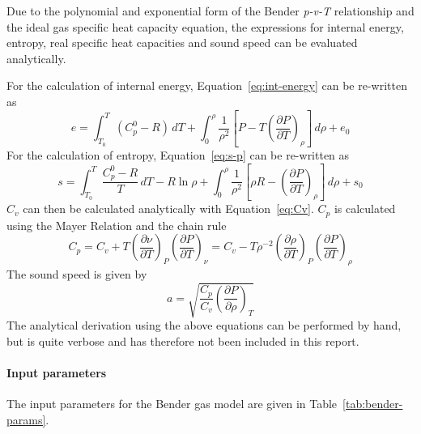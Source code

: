 Due to the polynomial and exponential form of the Bender \textit{p-v-T} relationship
and the ideal gas specific heat capacity equation,
the expressions for internal energy, entropy, real specific heat capacities and
sound speed can be evaluated analytically.

For the calculation of internal energy, Equation~\ref{eq:int-energy} can be
re-written as \cite{reynolds1979thermodynamic}
\begin{dmath}
e = \int_{T_0}^T \left(C_p^0 - R\right)\, dT
    + \int_0^{\rho}\frac{1}{\rho^2}\left[ P - T\left( \frac{\partial P}{\partial T} \right)_{\rho} \right]\, d\rho
    + e_0
\end{dmath}
For the calculation of entropy, Equation~\ref{eq:s-p} can be
re-written as \cite{reynolds1979thermodynamic}
\begin{dmath}
s = \int_{T_0}^T \frac{C_p^0 - R}{T}\, dT
    - R \ln{\rho}
    + \int_0^{\rho}\frac{1}{\rho^2}\left[ \rho R - \left( \frac{\partial P}{\partial T} \right)_{\rho} \right]\, d\rho
    + s_0
\end{dmath}
\(C_v\) can then be calculated analytically with Equation~\ref{eq:Cv}. \(C_p\) is
calculated using the Mayer Relation and the chain rule
\begin{dmath}
C_p = C_v + T\left(\frac{\partial\nu}{\partial T}\right)_P\left(\frac{\partial P}{\partial T}\right)_{\nu}
= C_v - T \rho^{-2} \left(\frac{\partial\rho}{\partial T}\right)_P\left(\frac{\partial P}{\partial T}\right)_{\rho}
\end{dmath}
The sound speed is given by
\begin{dmath}
a = \sqrt{\frac{C_p}{C_v} \left(\frac{\partial P}{\partial \rho}\right)_T}
\end{dmath}
The analytical derivation using the above equations can be performed by hand, but
is quite verbose and has therefore not been included in this report.

\paragraph{Input parameters}
The input parameters for the Bender gas model are given in Table~\ref{tab:bender-params}.

